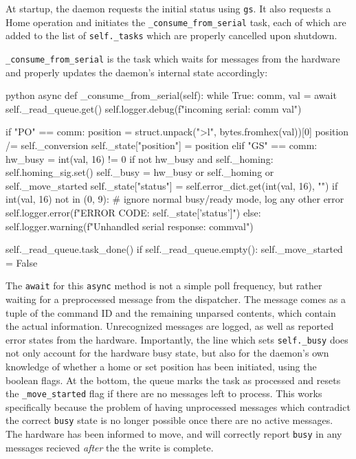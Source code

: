 At startup, the daemon requests the initial status using \texttt{gs}.
It also requests a Home operation and initiates the \texttt{\_consume\_from\_serial} task, each of which are added to the list of \texttt{self.\_tasks} which are properly cancelled upon shutdown.

\texttt{\_consume\_from\_serial} is the task which waits for messages from the hardware and properly updates the daemon's internal state accordingly:

\begin{codefragment}{python}
async def _consume_from_serial(self):
    while True:
        comm, val = await self._read_queue.get()
        self.logger.debug(f"incoming serial: {comm} {val}")

        if "PO" == comm:
            position = struct.unpack(">l", bytes.fromhex(val))[0]
            position /= self._conversion
            self._state["position"] = position
        elif "GS" == comm:
            hw_busy = int(val, 16) != 0
            if not hw_busy and self._homing:
                self.homing_sig.set()
            self._busy = hw_busy or self._homing or self._move_started
            self._state["status"] = self.error_dict.get(int(val, 16), "")
            if int(val, 16) not in (0, 9):
                # ignore normal busy/ready mode, log any other error
                self.logger.error(f"ERROR CODE: {self._state['status']}")
        else:
            self.logger.warning(f"Unhandled serial response: {comm}{val}")

        self._read_queue.task_done()
        if self._read_queue.empty():
            self._move_started = False
\end{codefragment}

The \texttt{await} for this \texttt{async} method is not a simple poll frequency, but rather waiting for a preprocessed message from the dispatcher.
The message comes as a tuple of the command ID and the remaining unparsed contents, which contain the actual information.
Unrecognized messages are logged, as well as reported error states from the hardware.
Importantly, the line which sets \texttt{self.\_busy} does not only account for the hardware busy state, but also for the daemon's own knowledge of whether a home or set position has been initiated, using the boolean flags.
At the bottom, the queue marks the task as processed and resets the \texttt{\_move\_started} flag if there are no messages left to process.
This works specifically because the problem of having unprocessed messages which contradict the correct \texttt{busy} state is no longer possible once there are no active messages.
The hardware has been informed to move, and will correctly report \texttt{busy} in any messages recieved \textit{after} the the write is complete.

